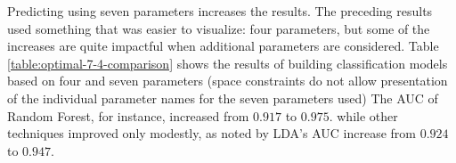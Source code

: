 \documentclass[letterpaper, notitlepage]{report}
\begin{document}
Predicting using seven parameters increases the results. The preceding results used something that was easier to visualize: four parameters, but some of the increases are quite impactful when additional parameters are considered.  Table \ref{table:optimal-7-4-comparison} shows the results of building classification models based on four and seven parameters (space constraints do not allow presentation of the individual  parameter names for the seven parameters used) The AUC of Random Forest, for instance, increased from $0.917$ to $0.975$. while other techniques  improved only modestly, as noted by LDA's AUC increase from $0.924$ to $0.947$. 
{

%

}
\end{document}
